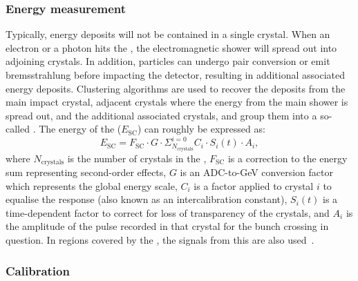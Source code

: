 \subsubsection{Energy measurement}
\label{sec:cms:ecal:energymeasurement}

Typically, energy deposits will not be contained in a single crystal. When an electron or a photon hits the \ECAL, the electromagnetic shower will spread out into adjoining crystals. In addition, particles can undergo pair conversion or emit bremsstrahlung before impacting the detector, resulting in additional associated energy deposits.
Clustering algorithms are used to recover the deposits from the main impact crystal, adjacent crystals where the energy from the main shower is spread out, and the additional associated crystals, and group them into a so-called \SC. %
The energy of the \SC ($E_{\textrm{SC}}$) can roughly be expressed as: 
\begin{equation} 
\label{eq:cms:ecal:energy}
E_{\text{SC}} = F_{\text{SC}} \cdot G \cdot \Sigma^{i=0}_{N_\text{crystals}}  C_{i} \cdot S_{i}(t) \cdot A_{i} ,
\end{equation}
where $N_\text{crystals}$ is the number of crystals in the \SC, $F_{\text{SC}}$ is a correction to the \SC energy sum representing second-order effects, $G$ is an ADC-to-GeV conversion factor which represents the global energy scale, $C_{i}$ is a factor applied to crystal $i$ to equalise the response (also known as an intercalibration constant), $S_{i}(t)$ is a time-dependent factor to correct for loss of transparency of the crystals, and $A_{i}$ is the amplitude of the pulse recorded in that crystal for the bunch crossing in question. In regions covered by the \ES, the signals from this \subdetector are also used~\cite{cmsEcalCalibration}.


\subsubsection{Calibration}
\label{sec:cms:ecal:calibration}

